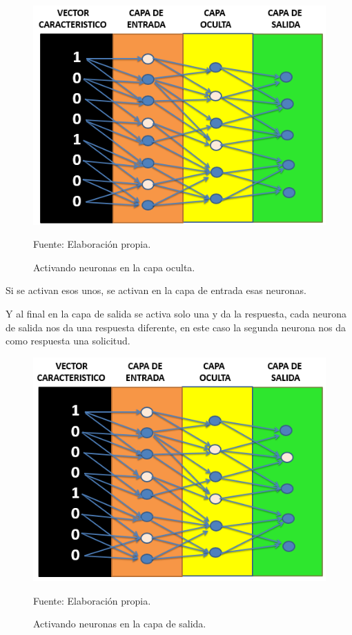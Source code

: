 \begin{figure}[h!]
	\centering
		\includegraphics[scale=0.5]{imagenes/IniciocapaOculta.png}
		\caption{Activando neuronas en la capa oculta.}
	\begin{center}
    Fuente: Elaboración propia.
    \end{center}
	\label{fig:IniciocapaOculta}
\end{figure}
\newpage
Si se activan esos unos, se activan en la capa de entrada esas neuronas.

Y al final en la capa de salida se activa solo una y da la respuesta, cada neurona de salida nos da una respuesta diferente, en este caso la segunda neurona nos da como respuesta una solicitud.

\begin{figure}[h!]
	\centering
		\includegraphics[scale=0.4]{imagenes/IniciocapaSalida.png}
		\caption{Activando neuronas en la capa de salida.}
	\begin{center}
    Fuente: Elaboración propia.
    \end{center}
	\label{fig:IniciocapaSalida}
\end{figure}

